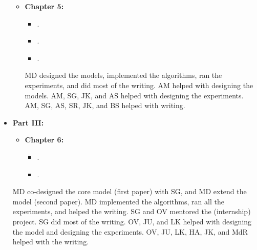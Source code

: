 \begin{itemize}
\begin{itemize}
            \item[] \textbf{Chapter 5:} \emph{}
            \begin{itemize}[label=\textbullet] 
                \item {}.
                \item {}.
                \item {}.
            \end{itemize}
            {\footnotesize{MD designed the models, implemented the algorithms, ran the experiments, and did most of the writing. 
            AM helped with designing the models. AM, SG, JK, and AS helped with designing the experiments. AM, SG, AS, SR, JK, and BS helped with writing.}\medskip}
        \end{itemize}
%   
    \item[] \textbf{Part III:} \emph{}
%  
        \begin{itemize}
            \setlength{\itemindent}{-33pt}
            \item[] \textbf{Chapter 6:} \emph{}
            \begin{itemize}[label=\textbullet] 
                \item {}.
                \item {}.
            \end{itemize}
        \end{itemize}
        {\footnotesize{MD co-designed the core model (first paper) with SG, and MD extend the model (second paper). MD implemented the algorithms, ran all the experiments, and helped the writing. SG and OV mentored the (internship) project. SG did most of the writing. OV, JU, and LK helped with designing the model and designing the experiments. OV, JU, LK, HA, JK, and MdR helped with the writing.}\medskip}
%
\end{itemize}

